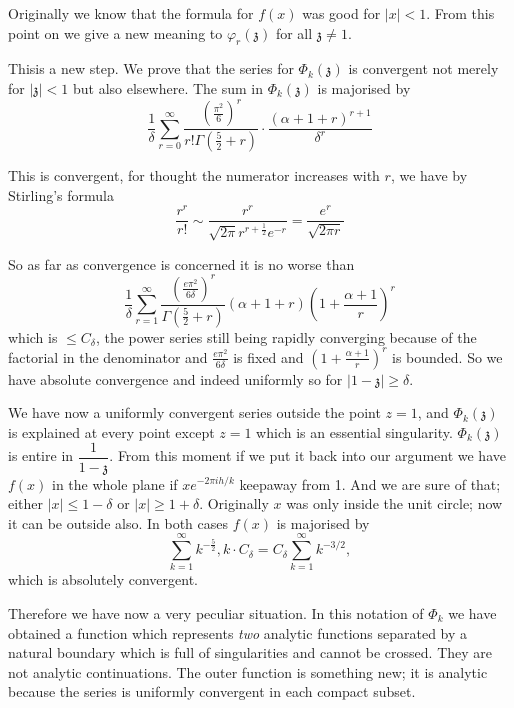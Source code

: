 Originally we know that the formula for $f(x)$ was good for $|x|<
1$. From this point on we give a new meaning to
$\varphi_r(\mathfrak{z})$ for all $\mathfrak{z} \neq 1$.

This\pageoriginale is a new step. We prove that the series for
$\Phi_k (\mathfrak{z})$ is convergent not merely for
$|\mathfrak{z}|<1$ but also elsewhere. The sum in $\Phi_k
(\mathfrak{z})$ is majorised by
$$
\frac{1}{\delta} \sum^\infty_{r=0} \frac{\left(
  \frac{\pi^2}{6}\right)^r}{r! \Gamma \left( \frac{5}{2}+ r\right)}
\cdot \frac{(\alpha+1 + r)^{r+1}}{\delta^r} 
$$

This is convergent, for thought the numerator increases with $r$, we
have by Stirling's formula
$$
\frac{r^r}{r!} \sim \frac{r^r}{\sqrt{2 \pi} r^{r+ \frac{1}{2}} e^{-r}}
= \frac{e^r}{\sqrt{2 \pi r}}
$$

So as far as convergence is concerned it is no worse than
$$
\frac{1}{\delta} \sum^\infty_{r=1} \frac{\left(\frac{e \pi^2}{6
    \delta} \right)^r}{\Gamma \left(\frac{5}{2} + r \right)} (\alpha +
1 + r)\left(1+ \frac{\alpha+1}{r}\right)^r 
$$
which is $\leq C_\delta$, the power series still being rapidly
converging because of the factorial in the denominator and $\frac{e
  \pi^2}{6 \delta}$ is fixed and $\left( 1+
\frac{\alpha+1}{r}\right)^r$ is bounded. So we have absolute
convergence and indeed uniformly so for $|1-\mathfrak{z}| \geq
\delta$.

We have now a uniformly convergent series outside the point $z=1$, and
$\Phi_k (\mathfrak{z})$ is explained at every point except $z=1$ which
is an essential singularity. $\Phi_k (\mathfrak{z})$ is entire in
$\dfrac{1}{1- \mathfrak{z}}$. From this moment if we put it back into
our argument we have $f(x)$ in the whole plane if $x e^{-2 \pi i h/k}$
keep\pageoriginale away from 1. And we are sure of that; either
$|x|\leq 1- \delta$ or $|x|\geq 1+ \delta$. Originally $x$ was only
inside the unit circle; now it can be outside also. In both cases
$f(x)$ is majorised by
$$
\sum^\infty_{k=1} k^{-\frac{5}{2}}, k \cdot C_\delta = C_\delta
\sum^\infty_{k=1} k^{-3/2},
$$
which is absolutely convergent.

Therefore we have now a very peculiar situation. In this notation of
$\Phi_k$ we have obtained a function which represents \textit{two}
analytic functions separated by a natural boundary which is full of
singularities and cannot be crossed. They are not analytic
continuations. The outer function is something new; it is analytic
because the series is uniformly convergent in each compact subset. 

